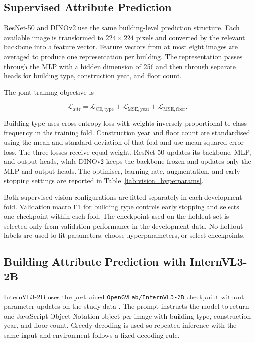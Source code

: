 \subsection{Supervised Attribute Prediction}
\label{sec:supervised_attribute_prediction}

ResNet-50 and DINOv2 use the same building-level prediction structure.
Each available image is transformed to $224 \times 224$ pixels and converted by the relevant backbone into a feature vector.
Feature vectors from at most eight images are averaged to produce one representation per building.
The representation passes through the \acs{MLP} with a hidden dimension of 256 and then through separate heads for building type, construction year, and floor count.

The joint training objective is

\begin{equation}
	\label{eq:attr_loss}
	\mathcal{L}_{\mathrm{attr}}
	= \mathcal{L}_{\mathrm{CE,type}}
	+ \mathcal{L}_{\mathrm{MSE,year}}
	+ \mathcal{L}_{\mathrm{MSE,floor}} .
\end{equation}

Building type uses cross entropy loss with weights inversely proportional to class frequency in the training fold.
Construction year and floor count are standardised using the mean and standard deviation of that fold and use mean squared error loss.
The three losses receive equal weight.
ResNet-50 updates its backbone, \ac{MLP}, and output heads, while DINOv2 keeps the backbone frozen and updates only the \ac{MLP} and output heads.
The optimiser, learning rate, augmentation, and early stopping settings are reported in Table~\ref{tab:vision_hyperparams}.

Both supervised vision configurations are fitted separately in each development fold.
Validation macro F1 for building type controls early stopping and selects one checkpoint within each fold.
The checkpoint used on the holdout set is selected only from validation performance in the development data.
No holdout labels are used to fit parameters, choose hyperparameters, or select checkpoints.

\subsection{Building Attribute Prediction with InternVL3-2B}
\label{sec:vlm_attribute_inference}

InternVL3-2B uses the pretrained \texttt{OpenGVLab/\allowbreak InternVL3-2B} checkpoint without parameter updates on the study data \parencite{zhu2025}.
The prompt instructs the model to return one JavaScript Object Notation object per image with building type, construction year, and floor count.
Greedy decoding is used so repeated inference with the same input and environment follows a fixed decoding rule.

